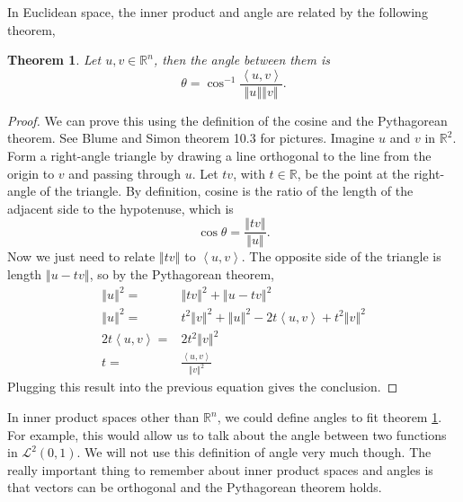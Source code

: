 \documentclass[12pt,reqno]{amsart}
\newtheorem{theorem}{Theorem}[section]
\theoremstyle{definition}
\def\R{\mathbb{R}}
\newcommand{\iprod}[2]{\left\langle {#1} , {#2} \right\rangle}
\newcommand{\norm}[1]{\left\Vert {#1} \right\Vert}
\begin{document}
In Euclidean space, the inner product and angle are related by the
following theorem,
\begin{theorem}\label{thm:angle}
  Let $u, v \in \R^n$, then the angle between them is
  \[ \theta = \cos^{-1} \frac{\iprod{u}{v}}{\norm{u}\norm{v}}. \]  
\end{theorem}
\begin{proof}
  We can prove this using the definition of the cosine and the
  Pythagorean theorem.  See Blume and Simon theorem 10.3 for
  pictures. Imagine $u$ and $v$ in $\R^2$. Form a right-angle triangle
  by drawing a line orthogonal to the line from the origin to $v$ and
  passing through $u$. Let $t v$, with $t \in \R$, be the point at the
  right-angle of the triangle. By definition, cosine is the ratio of
  the length of the adjacent side to the hypotenuse, which is
  \[ \cos \theta = \frac{\norm{tv}}{\norm{u}}. \]
  Now we just need to relate $\norm{tv}$ to $\iprod{u}{v}$. The
  opposite side of the triangle is length $\norm{u - tv}$, so by the
  Pythagorean theorem,
  \begin{align*}
    \norm{u}^2 = & \norm{tv}^2 + \norm{u - tv}^2 \\
    \norm{u}^2 = & t^2 \norm{v}^2 + \norm{u}^2 - 2t\iprod{u}{v} + t^2
    \norm{v}^2 
    \\
    2 t \iprod{u}{v} = & 2 t^2 \norm{v}^2 \\
    t = & \frac{\iprod{u}{v}}{\norm{v}^2}
  \end{align*}
  Plugging this result into the previous equation gives the conclusion.
\end{proof}
In inner product spaces other than $\R^n$, we could define angles to
fit theorem \ref{thm:angle}. For example, this would allow us to talk
about the angle between two functions in $\mathcal{L}^2(0,1)$. We will
not use this definition of angle very much though. The really
important thing to remember about inner product spaces and angles is
that vectors can be orthogonal and the Pythagorean theorem holds.
\end{document}
